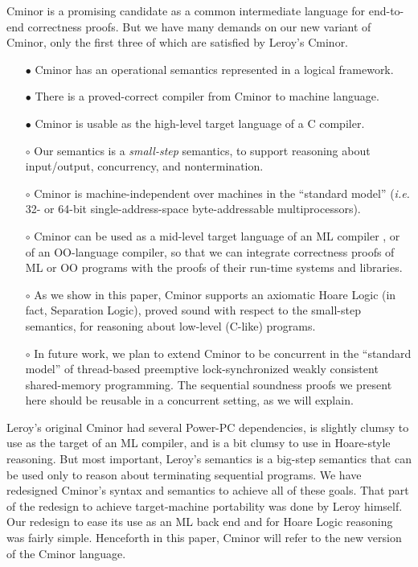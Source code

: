 \documentclass{llncs}
\newcommand{\cminor}{Cminor}
\begin{document}
\cminor{} is a promising candidate
as a common intermediate language for end-to-end correctness proofs.
But we have many demands on our new variant of \cminor, 
only the first three of which are 
satisfied by Leroy's \cminor.
\begin{itemize}
\item[$\bullet$] \cminor{} has an operational semantics
represented in a logical framework.
\item[$\bullet$] There is a proved-correct compiler from \cminor{} to machine language.
\item[$\bullet$] \cminor{} is usable as the high-level target language of
a C compiler.
\item[$\circ$] Our semantics is a \emph{small-step} semantics, 
to support reasoning about input/output, concurrency,
and nontermination.
\item[$\circ$] \cminor{} is machine-independent 
over machines in the ``standard model''
(\textit{i.e.} 32- or 64-bit single-address-space byte-addressable multiprocessors).
\item[$\circ$] \cminor{} can be used as a mid-level target language of an ML compiler \cite{dargaye:jfla07},
or of an OO-language compiler, so that we can
integrate correctness proofs of ML or OO programs with the
proofs of their run-time systems and libraries.
\item[$\circ$] As we show in this paper, \cminor{} supports an axiomatic Hoare Logic 
(in fact, Separation Logic), proved sound
with respect to the small-step semantics, for reasoning about low-level 
(C-like) programs.
\item[$\circ$] 
In future work, we plan to extend \cminor{} to
\label{L-Concur}
 be concurrent in  the ``standard model'' of thread-based 
preemptive lock-synchronized weakly consistent shared-memory programming.
The sequential soundness proofs we present here should be reusable
in a concurrent setting, as we will explain.
\end{itemize}

Leroy's original \cminor{} had several Power-PC dependencies,
is slightly clumsy to use as the target of an ML compiler,
and is a bit clumsy to use in Hoare-style reasoning.
But most important, Leroy's semantics is a big-step semantics
that can be used only to reason about terminating sequential 
programs.
We have redesigned \cminor's syntax and semantics 
to achieve all of these goals.
That part of the redesign to achieve target-machine portability was
done by Leroy himself.  
Our redesign to ease its use as an ML back end
and for Hoare Logic reasoning was fairly simple.
Henceforth in this paper, \cminor{} will refer to the new version of the \cminor{} language.
\end{document}

